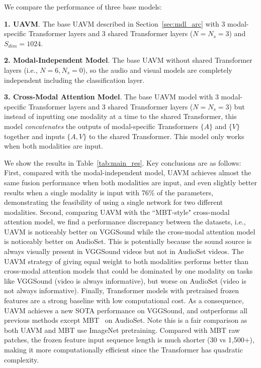 \documentclass[journal]{IEEEtran}
\newcommand{\rev}[1]{{\color{dblue} #1}}
\begin{document}
We compare the performance of three base models:

\textbf{1. UAVM}. The base UAVM described in Section~\ref{sec:mdl_arc} with 3 modal-specific Transformer layers and 3 shared Transformer layers ($N=N_s=3$) and $S_{dim}=1024$.

\textbf{2. Modal-Independent Model}. The base UAVM without shared Transformer layers (i.e., $N=6, N_s=0$), so the audio and visual models are completely independent including the classification layer. 

\textbf{3. Cross-Modal Attention Model}. The base UAVM model with 3 modal-specific Transformer layers and 3 shared Transformer layers ($N=N_s=3$) but instead of inputting one modality at a time to the shared Transformer, this model \emph{concatenates} the outputs of modal-specific Transformers $\{A\}$ and $\{V\}$ together and inputs $\{A, V\}$ to the shared Transformer. This model only works when both modalities are input.

We show the results in Table~\ref{tab:main_res}. Key conclusions are as follows: First, compared with the modal-independent model, UAVM achieves almost the same fusion performance when both modalities are input, and even slightly better results when a single modality is input \rev{with 76\% of the parameters}, demonstrating the feasibility of using a single network for two different modalities. Second, comparing UAVM with the ``MBT-style" cross-modal attention model, we find a performance discrepancy between the datasets, i.e., UAVM is noticeably better on VGGSound while the cross-modal attention model is noticeably better on AudioSet. This is potentially because the sound source is always visually present in VGGSound videos but not in AudioSet videos. The UAVM strategy of giving equal weight to both modalities performs better than cross-modal attention models that could be dominated by one modality on tasks like VGGSound (video is always informative), but worse on AudioSet (video is not always informative). Finally, Transformer models with pretrained frozen features are a strong baseline with low computational cost. As a consequence, UAVM achieves a new SOTA performance on VGGSound, and outperforms all previous methods except MBT~\cite{nagrani2021attention} on AudioSet. \rev{Note this is a fair comparison as both UAVM and MBT use ImageNet pretraining}. \rev{Compared with MBT raw patches, the frozen feature input sequence length} is much shorter (30 vs 1,500+), making it more computationally efficient since the Transformer has quadratic complexity.
\end{document}
